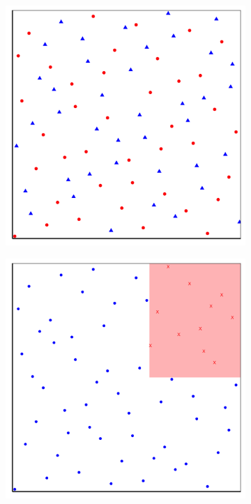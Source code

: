 \documentclass[a4paper,11pt]{article} %
\begin{document}
\begin{figure}[htbp]
\centering
  \begin{subfigure}[b]{0.3\textwidth}
    \includegraphics[width=\textwidth]{p3.png}
    \caption{}
  \end{subfigure}
  \begin{subfigure}[b]{0.3\textwidth}
    \includegraphics[width=\textwidth]{p4.png}

\end{subfigure}
\end{figure}
\end{document}
